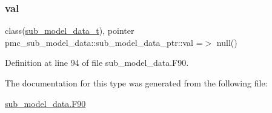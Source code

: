 \subsubsection{\texorpdfstring{val}{val}}
{\footnotesize\ttfamily class(\mbox{\hyperlink{structpmc__sub__model__data_1_1sub__model__data__t}{sub\+\_\+model\+\_\+data\+\_\+t}}), pointer pmc\+\_\+sub\+\_\+model\+\_\+data\+::sub\+\_\+model\+\_\+data\+\_\+ptr\+::val =$>$ null()\hspace{0.3cm}{\ttfamily [private]}}



Definition at line 94 of file sub\+\_\+model\+\_\+data.\+F90.



The documentation for this type was generated from the following file\+:\begin{DoxyCompactItemize}
\item 
\mbox{\hyperlink{sub__model__data_8_f90}{sub\+\_\+model\+\_\+data.\+F90}}\end{DoxyCompactItemize}
